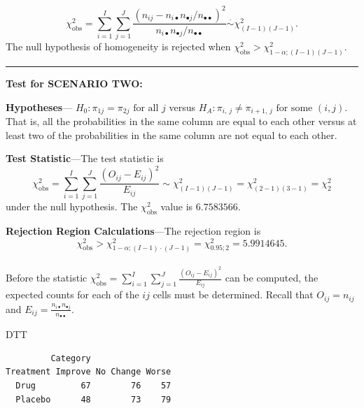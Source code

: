 \documentclass[
]{article}
\newenvironment{Shaded}{\begin{snugshade}}{\end{snugshade}}
\newcommand{\FunctionTok}[1]{\textcolor[rgb]{0.00,0.00,0.00}{#1}}
\newcommand{\NormalTok}[1]{#1}
\newcommand{\OtherTok}[1]{\textcolor[rgb]{0.56,0.35,0.01}{#1}}
\newcommand{\SpecialCharTok}[1]{\textcolor[rgb]{0.00,0.00,0.00}{#1}}
\begin{document}
\[\chi_{\text{obs}}^2=\sum_{i=1}^I\sum_{j=1}^J \frac{(n_{ij} - n_{i\bullet} n_{\bullet
j}/n_{\bullet\bullet})^2}{n_{i\bullet} n_{\bullet j}/n_{\bullet\bullet}} \overset{\cdot}{\sim}
\chi^2_{(I-1)(J-1)}.\] The null hypothesis of homogeneity is rejected when
\(\chi_{\text{obs}}^2 > \chi^2_{1-\alpha; (I-1)(J-1)}\).

\begin{center}\rule{0.5\linewidth}{0.5pt}\end{center}

\textbf{Test for SCENARIO TWO:}

\textbf{Hypotheses}--- \(H_0: \pi_{1j}=\pi_{2j} \text{ for all } j\) versus \(H_A: \pi_{i,\, j} \ne \pi_{i+1,\, j}\text{ for some }(i, j)\). That is, all the probabilities in the same column are equal to each other versus at least two of the probabilities in the same column are not equal to each other.

\textbf{Test Statistic}---The test statistic is
\[\chi_{\text{obs}}^2=\sum_{i=1}^I \sum_{j=1}^J 
        \frac{(O_{ij}-E_{ij})^2}{E_{ij}} \sim \chi^2_{(I-1)(J-1)}=
        \chi^2_{(2-1)(3-1)}=\chi^2_2\]
under the null hypothesis. The \(\chi^2_{\text{obs}}\) value is
\(6.7583566\).

\textbf{Rejection Region Calculations}---The rejection region is
\[\chi_{\text{obs}}^2 > \chi^2_{1-\alpha; (I-1)\cdot(J-1)} = 
        \chi^2_{0.95;2}=5.9914645.\]\\
Before the statistic \(\chi^2_{\text{obs}}= \sum_{i=1}^I\sum_{j=1}^J \frac{(O_{ij} - E_{ij})^2}{E_{ij}}\) can be computed, the expected counts for each of the \(ij\) cells must be determined. Recall that \(O_{ij}=n_{ij}\) and \(E_{ij}=\frac{n_{i\bullet}n_{\bullet j}}{n_{\bullet\bullet}}.\)

\begin{Shaded}
\begin{Highlighting}[]
\NormalTok{DTT}
\end{Highlighting}
\end{Shaded}

\begin{verbatim}
         Category
Treatment Improve No Change Worse
  Drug         67        76    57
  Placebo      48        73    79
\end{verbatim}

\begin{Shaded}
\end{Shaded}
\end{document}
